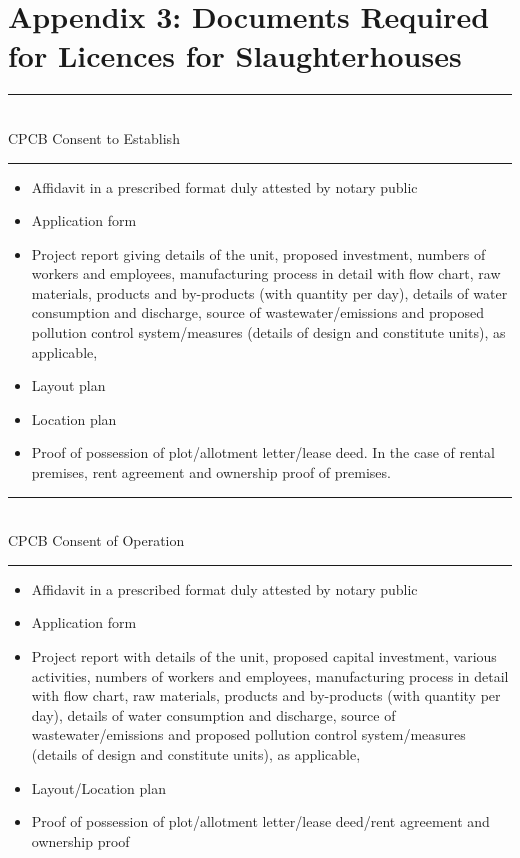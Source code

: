 \documentclass[a4paper, 12pt]{article}
\begin{document}
\section*{Appendix 3: Documents Required for Licences for Slaughterhouses}
\noindent\rule{16cm}{0.4pt} \\
CPCB Consent to Establish \\
\noindent\rule{16cm}{0.4pt}
\begin{itemize}[noitemsep]
\item Affidavit in a prescribed format duly attested by notary public 
\item Application form 
\item Project report giving details of the unit, proposed investment, numbers of workers and employees, manufacturing process in detail with flow chart, raw materials, products and by-products (with quantity per day), details of water consumption and discharge, source of wastewater/emissions and proposed pollution control system/measures (details of design and constitute units), as applicable, 
\item Layout plan 
\item Location plan 
\item Proof of possession of plot/allotment letter/lease deed. In the case of rental premises, rent agreement and ownership proof of premises. 
\end{itemize}
\noindent\rule{16cm}{0.4pt}\\
CPCB Consent of Operation
	\\
\noindent\rule{16cm}{0.2pt}
\begin{itemize}[noitemsep]
\item Affidavit in a prescribed format duly attested by notary public 
\item Application form 
\item Project report with details of the unit, proposed capital investment, various activities, numbers of workers and employees, manufacturing process in detail with flow chart, raw materials, products and by-products (with quantity per day), details of water consumption and discharge, source of wastewater/emissions and proposed pollution control system/measures (details of design and constitute units), as applicable, 
\item Layout/Location plan
\item Proof of possession of plot/allotment letter/lease deed/rent agreement and ownership proof 
\end{itemize}
\end{document}
